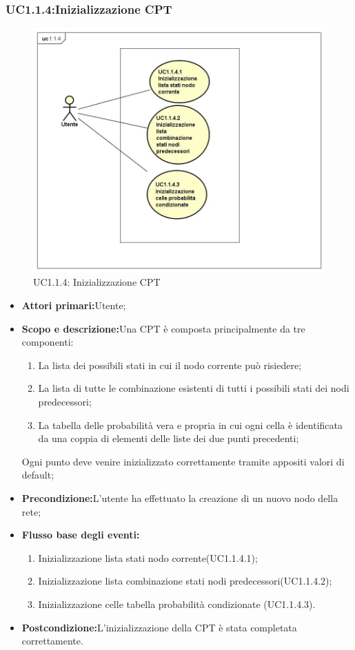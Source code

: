 \subsubsection{UC1.1.4:Inizializzazione CPT}
\begin{figure} [H]
	\centering
	\includegraphics[scale=0.45]{Img/UC1-1-4}
	\caption{UC1.1.4: Inizializzazione CPT}\label{}
\end{figure}
\begin{itemize}
	\item{\textbf{Attori primari:}Utente;}
	\item{\textbf{Scopo e descrizione:}Una CPT è composta principalmente da tre componenti:
		\begin{enumerate}
			\item{La lista dei possibili stati in cui il nodo corrente può risiedere;}
			\item{La lista di tutte le combinazione esistenti di tutti i possibili stati dei nodi predecessori;}
			\item{La tabella delle probabilità vera e propria in cui ogni cella è identificata da una coppia di elementi delle liste dei due punti precedenti;}
		\end{enumerate}			
		Ogni punto deve venire inizializzato correttamente tramite appositi valori di default;
	}
	\item{\textbf{Precondizione:}L'utente ha effettuato la creazione di un nuovo nodo della rete;}
	\item{\textbf{Flusso base degli eventi:}}
	\begin{enumerate}
		\item{Inizializzazione lista stati nodo corrente(UC1.1.4.1);}
		\item{Inizializzazione lista combinazione stati nodi predecessori(UC1.1.4.2);}
		\item{Inizializzazione celle tabella probabilità condizionate (UC1.1.4.3).}
	\end{enumerate}
	\item{\textbf{Postcondizione:}L'inizializzazione della CPT è stata completata correttamente.}
\end{itemize}

